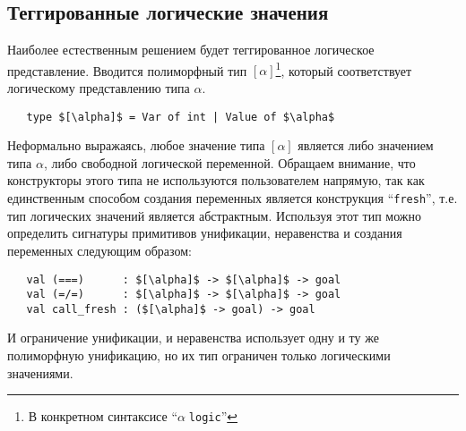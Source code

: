 \subsection{Теггированные логические значения}

Наиболее естественным решением будет теггированное логическое представление.
Вводится полиморфный тип $[\alpha]$\footnote{В конкретном синтаксисе ``$\alpha\;$\lstinline|logic|''}, который соответствует логическому представлению типа $\alpha$.


\begin{lstlisting}
   type $[\alpha]$ = Var of int | Value of $\alpha$
\end{lstlisting}

\noindent Неформально выражаясь, любое значение типа $[\alpha]$ является либо значением типа $\alpha$, либо свободной логической переменной.
Обращаем внимание, что конструкторы этого типа не используются пользователем напрямую, так как единственным способом создания переменных является конструкция \enquote{\lstinline=fresh=}, т.е. тип логических значений является абстрактным.
Используя этот тип можно определить сигнатуры примитивов унификации, неравенства и создания переменных следующим образом:


\begin{lstlisting}
   val (===)      : $[\alpha]$ -> $[\alpha]$ -> goal
   val (=/=)      : $[\alpha]$ -> $[\alpha]$ -> goal
   val call_fresh : ($[\alpha]$ -> goal) -> goal
\end{lstlisting}

\noindent И ограничение унификации, и неравенства использует одну и ту же полиморфную унификацию, но их тип ограничен только логическими значениями.


